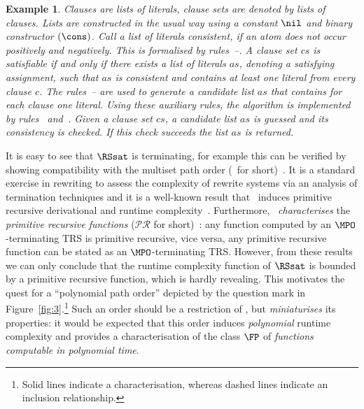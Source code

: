 \documentclass{LMCS}
\newtheorem{example}[thm]{Example}
\begin{document}
\begin{example}
Clauses are lists of literals, 
clause sets are denoted by lists of clauses.
Lists are constructed in the usual way 
using a constant $\nil$ and binary constructor $(\cons)$. 
Call a list of literals consistent, if an atom does not 
occur positively and negatively. This is formalised by
rules~--. 
A clause set $cs$ is satisfiable if and only if 
there exists a list of literals $as$, denoting a satisfying assignment, 
such that $as$ is consistent and contains at least one literal from every clause $c$.
The rules~-- 
are used to generate a candidate list $as$ that contains for each clause 
one literal.
Using these auxiliary rules, the algorithm is implemented 
by rules~ and~.
Given a clause set $cs$, a candidate list $as$ 
is guessed and its consistency is checked.
If this check succeeds the list $as$ is returned.
\end{example}

It is easy to see that $\RSsat$ is terminating, for example
this can be verified by showing compatibility with the multiset
path order (\MPO\ for short)~\cite{TeReSe}.
It is a standard exercise in rewriting to assess the 
complexity of rewrite systems via an analysis of termination techniques
and it is a well-known result that \MPO\ induces 
primitive recursive derivational and runtime complexity~\cite{H92,B95,MW03}.
Furthermore, \MPO\ \emph{characterises} the 
\emph{primitive recursive functions} ($\mathcal{PR}$ for short)~\cite{CW97}:
any function computed by an $\MPO$-terminating TRS is primitive recursive, vice versa, 
any primitive recursive function can be stated as an $\MPO$-terminating TRS.
However, from these results we can only conclude that 
the runtime complexity function of $\RSsat$ is
bounded by a primitive recursive function, which is hardly revealing.
This motivates the quest for a ``polynomial path order'' depicted by
the question mark in Figure~\ref{fig:3}.\footnote{
Solid lines indicate a characterisation,
whereas dashed lines indicate an inclusion relationship.}
Such an order should be a restriction of \MPO, but \emph{miniaturises} its properties: it would be expected
that this order induces \emph{polynomial} runtime complexity and
provides a characterisation of the class $\FP$ of \emph{functions computable
in polynomial time}.
\end{document}
